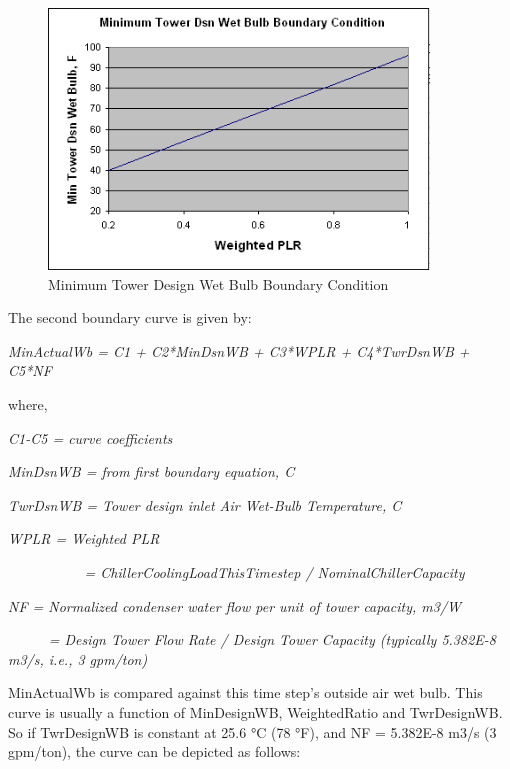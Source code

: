 \begin{figure}[hbtp] %
\centering
\includegraphics[width=0.9\textwidth, height=0.9\textheight, keepaspectratio=true]{media/image6482.png}
\caption{Minimum Tower Design Wet Bulb Boundary Condition \protect \label{fig:minimum-tower-design-wet-bulb-boundary}}
\end{figure}

The second boundary curve is given by:

\emph{MinActualWb = C1 + C2*MinDsnWB + C3*WPLR + C4*TwrDsnWB + C5*NF}

where,

\emph{C1-C5 = curve coefficients}

\emph{MinDsnWB = from first boundary equation, C}

\emph{TwrDsnWB = Tower design inlet Air Wet-Bulb Temperature, C}

\emph{WPLR = Weighted PLR}

\emph{~~~~~~~~~~ = ChillerCoolingLoadThisTimestep / NominalChillerCapacity}

\emph{NF = Normalized condenser water flow per unit of tower capacity, m3/W}

\emph{~~~~~ = Design Tower Flow Rate / Design Tower Capacity (typically 5.382E-8 m3/s, i.e., 3 gpm/ton)}

MinActualWb is compared against this time step's outside air wet bulb. This curve is usually a function of MinDesignWB, WeightedRatio and TwrDesignWB. So if TwrDesignWB is constant at 25.6 °C (78 °F), and NF = 5.382E-8 m3/s (3 gpm/ton), the curve can be depicted as follows:


